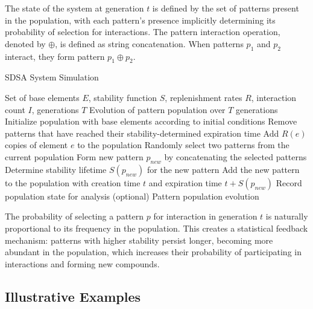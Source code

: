 \documentclass[preprint,12pt]{elsarticle}
\begin{document}
The state of the system at generation $t$ is defined by the set of patterns present in the population, with each pattern's presence implicitly determining its probability of selection for interactions. The pattern interaction operation, denoted by $\oplus$, is defined as string concatenation. When patterns $p_1$ and $p_2$ interact, they form pattern $p_1 \oplus p_2$.


\begin{algorithm}[H]
\caption{SDSA System Simulation}
\begin{algorithmic}[1]
\REQUIRE Set of base elements $E$, stability function $S$, replenishment rates $R$, interaction count $I$, generations $T$
\ENSURE Evolution of pattern population over $T$ generations
\STATE Initialize population with base elements according to initial conditions
   \STATE Remove patterns that have reached their stability-determined expiration time
       \STATE Add $R(e)$ copies of element $e$ to the population
   \ENDFOR
       \STATE Randomly select two patterns from the current population
       \STATE Form new pattern $p_{new}$ by concatenating the selected patterns
       \STATE Determine stability lifetime $S(p_{new})$ for the new pattern
       \STATE Add the new pattern to the population with creation time $t$ and expiration time $t + S(p_{new})$
   \ENDFOR
   \STATE Record population state for analysis (optional)
\ENDFOR
\RETURN Pattern population evolution
\end{algorithmic}
\end{algorithm}


The probability of selecting a pattern $p$ for interaction in generation $t$ is naturally proportional to its frequency in the population. This creates a statistical feedback mechanism: patterns with higher stability persist longer, becoming more abundant in the population, which increases their probability of participating in interactions and forming new compounds.

\subsection{Illustrative Examples}
\end{document}

